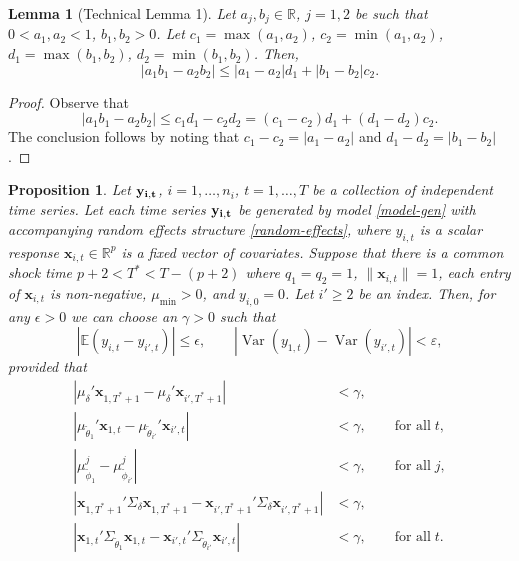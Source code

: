 \documentclass[11pt]{article}
\newcommand{\R}{\mathbb{R}}
\newcommand{\x}{\textbf{x}}
\def\E{\mathbb{E}} %
\DeclareMathOperator{\Var}{Var} %
\newtheorem{lem}{Lemma}
\newtheorem{prop}{Proposition}
\theoremstyle{definition}
\begin{document}
\begin{lem}[Technical Lemma 1] \label{lem:absdiff}
Let $a_j, b_j \in \R$, $j = 1,2$ be such that $0 < a_1,a_2 < 1$, $b_1,b_2 > 0$. Let $c_1 = \max(a_1,a_2)$, $c_2 = \min(a_1,a_2)$, $d_1 = \max(b_1,b_2)$, $d_2 = \min(b_1,b_2)$. Then, 
$$
  |a_1b_1 - a_2b_2| \leq |a_1 - a_2|d_1 + |b_1 - b_2|c_2.
$$
\end{lem}

\begin{proof}
Observe that 
$$
  |a_1b_1 - a_2b_2| \leq c_1d_1 - c_2d_2 = (c_1 - c_2)d_1 + (d_1 - d_2)c_2. 
$$
The conclusion follows by noting that $c_1 - c_2 = |a_1 - a_2|$ and $d_1 - d_2 = |b_1 - b_2|$.
\end{proof}


\begin{prop}
	Let $\bf{y}_{i,t}$, $i = 1,\ldots,n_i$, $t = 1,\ldots, T$ be a collection of independent time series. Let each time series $\bf{y}_{i,t}$ be generated by model \eqref{model-gen} with accompanying random effects structure \eqref{random-effects}, where $y_{i,t}$ is a scalar response $\x_{i,t} \in \R^p$ is a fixed vector of covariates. Suppose that there is a common shock time $p + 2 < T^* < T - (p+2)$ where $q_1 = q_2 = 1$, $\|\x_{i,t}\| = 1$, each entry of $\x_{i,t}$ is non-negative, $\mu_{\min} > 0$, and $y_{i,0} = 0$. Let $i' \geq 2$ be an index. Then, for any $\epsilon > 0$ we can choose an $\gamma > 0$ such that 
	$$
	  \left\vert\E(y_{i,t} - y_{i',t})\right\vert \leq \epsilon, \qquad |\Var(y_{1,t}) - \Var(y_{i',t})| < \varepsilon,
	$$
	provided that 
	\begin{align*}
  |\mu_\delta'\x_{1,T^*+1} - \mu_\delta'\x_{i',T^*+1}| &< \gamma, \\
  \left\vert\mu_{\tilde\theta_{1}}'\x_{1,t} - \mu_{\tilde\theta_{i'}}'\x_{i',t}\right\vert &< \gamma, \qquad \text{for all} \; t, \\
  |\mu_{\tilde\phi_1}^j - \mu_{\tilde\phi_{i'}}^j| &< \gamma, \qquad \text{for all} \; j, \\
  |\x_{1,T^*+1}'\Sigma_\delta\x_{1,T^*+1} - \x_{i',T^*+1}'\Sigma_\delta\x_{i',T^*+1}| &< \gamma, \\
  |\x_{1,t}'\Sigma_{\tilde\theta_{1}}\x_{1,t} - \x_{i',t}'\Sigma_{\tilde\theta_{i'}}\x_{i',t}| &< \gamma, \qquad \text{for all} \; t.
	\end{align*}
\end{prop}
\end{document}
